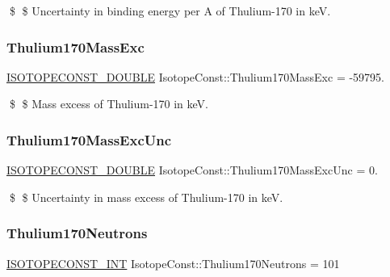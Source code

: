 \$ \$ Uncertainty in binding energy per A of Thulium-\/170 in keV. \mbox{\label{group___isotope_const-_thulium-_tm170_gaa45f2fc4b973b5ff459fbadd82615698}} 
\subsubsection{\texorpdfstring{Thulium170\+Mass\+Exc}{Thulium170MassExc}}
{\footnotesize\ttfamily \mbox{\hyperlink{group___isotope_const-_macros_ga8f45a7272ce02c0b4c65c44636ed719a}{I\+S\+O\+T\+O\+P\+E\+C\+O\+N\+S\+T\+\_\+\+D\+O\+U\+B\+LE}} Isotope\+Const\+::\+Thulium170\+Mass\+Exc = -\/59795.}

\$ \$ Mass excess of Thulium-\/170 in keV. \mbox{\label{group___isotope_const-_thulium-_tm170_gad8147f34a4f3a4317b7daa4e1da4cfff}} 
\subsubsection{\texorpdfstring{Thulium170\+Mass\+Exc\+Unc}{Thulium170MassExcUnc}}
{\footnotesize\ttfamily \mbox{\hyperlink{group___isotope_const-_macros_ga8f45a7272ce02c0b4c65c44636ed719a}{I\+S\+O\+T\+O\+P\+E\+C\+O\+N\+S\+T\+\_\+\+D\+O\+U\+B\+LE}} Isotope\+Const\+::\+Thulium170\+Mass\+Exc\+Unc = 0.}

\$ \$ Uncertainty in mass excess of Thulium-\/170 in keV. \mbox{\label{group___isotope_const-_thulium-_tm170_ga648194ba41232d10ef077a502ac33cf0}} 
\subsubsection{\texorpdfstring{Thulium170\+Neutrons}{Thulium170Neutrons}}
{\footnotesize\ttfamily \mbox{\hyperlink{group___isotope_const-_macros_ga5f18360b3e99483a35c32d789e62621c}{I\+S\+O\+T\+O\+P\+E\+C\+O\+N\+S\+T\+\_\+\+I\+NT}} Isotope\+Const\+::\+Thulium170\+Neutrons = 101}

